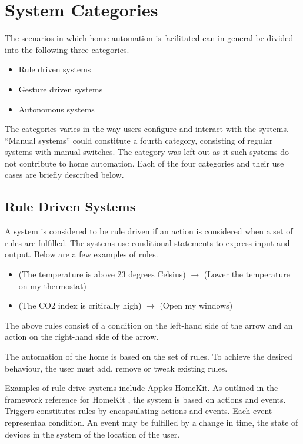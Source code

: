 \section{System Categories}\label{sec:system-categories}

The scenarios in which home automation is facilitated can in general be divided into the following three categories.

\begin{itemize}
\item Rule driven systems
\item Gesture driven systems
\item Autonomous systems
\end{itemize}

The categories varies in the way users configure and interact with the systems. ``Manual systems'' could constitute a fourth category, consisting of regular systems with manual switches. The category was left out as it such systems do not contribute to home automation.
Each of the four categories and their use cases are briefly described below.

\subsection{Rule Driven Systems}

A system is considered to be rule driven if an action is considered when a set of rules are  fulfilled. The systems use conditional statements to express input and output. Below are a few examples of rules.

\begin{itemize}
\item (The temperature is above 23 degrees Celsius) $\rightarrow$ (Lower the temperature on my thermostat)
\item (The CO2 index is critically high) $\rightarrow$ (Open my windows)
\end{itemize}

The above rules consist of a condition on the left-hand side of the arrow and an action on the right-hand side of the arrow.

The automation of the home is based on the set of rules. To achieve the desired behaviour, the user must add, remove or tweak existing rules.

Examples of rule drive systems include Apples HomeKit. As outlined in the framework reference for HomeKit \cite{applehomekitref}, the system is based on actions and events. Triggers constitutes rules by encapsulating actions and events. Each event representaa condition. An event may be fulfilled by a change in time, the state of devices in the system of the location of the user.

